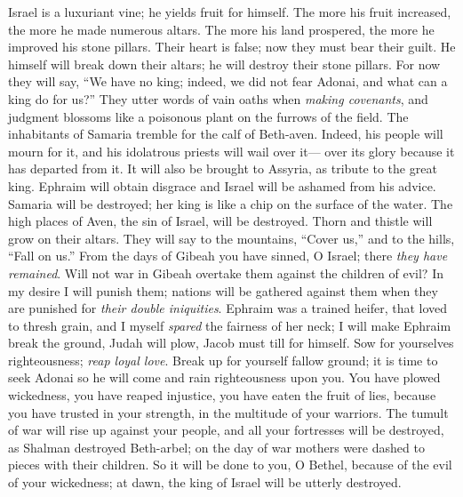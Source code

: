 \begin{biblechapter} %
 Israel is a luxuriant vine; 
he yields fruit for himself. 
The more his fruit increased, 
the more he made numerous altars. 
The more his land prospered, 
the more he improved his stone pillars.
\verse Their heart is false; 
now they must bear their guilt. 
He himself will break down their altars; 
he will destroy their stone pillars.
\verse For now they will say, 
“We have no king; 
indeed, we did not fear Adonai, 
and what can a king do for us?”
\verse They utter words of vain oaths 
when \textit{making covenants}, 
and judgment blossoms like a poisonous plant 
on the furrows of the field.
\verse The inhabitants of Samaria tremble 
for the calf of Beth-aven. 
Indeed, his people will mourn for it, 
and his idolatrous priests will wail over it— 
over its glory because it has departed from it.
\verse It will also be brought to Assyria, 
as tribute to the great king. 
Ephraim will obtain disgrace 
and Israel will be ashamed from his advice.
\verse Samaria will be destroyed; 
her king is like a chip on the surface of the water.
\verse The high places of Aven, 
the sin of Israel, will be destroyed. 
Thorn and thistle will grow 
on their altars. 
They will say to the mountains, “Cover us,” 
and to the hills, “Fall on us.”
\verse From the days of Gibeah you have sinned, O Israel; 
there \textit{they have remained}. 
Will not war in Gibeah overtake them 
against the children of evil?
\verse In my desire I will punish them; 
nations will be gathered against them 
when they are punished for \textit{their double iniquities}.
\verse Ephraim was a trained heifer, 
that loved to thresh grain, 
and I myself \textit{spared} 
the fairness of her neck; 
I will make Ephraim break the ground, 
Judah will plow, 
Jacob must till for himself.
\verse Sow for yourselves righteousness; 
\textit{reap loyal love}. 
Break up for yourself fallow ground; 
it is time to seek Adonai 
so he will come and rain 
righteousness upon you.
\verse You have plowed wickedness, 
you have reaped injustice, 
you have eaten the fruit of lies, 
because you have trusted in your strength, 
in the multitude of your warriors.
\verse The tumult of war will rise up against your people, 
and all your fortresses will be destroyed, 
as Shalman destroyed Beth-arbel; 
on the day of war 
mothers were dashed to pieces with their children.
\verse So it will be done to you, O Bethel, 
because of the evil of your wickedness; 
at dawn, the king of Israel 
will be utterly destroyed.
\end{biblechapter}

